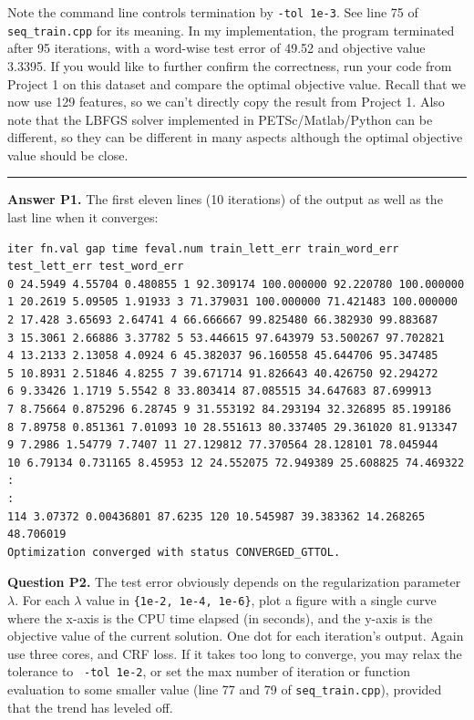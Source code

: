 \documentclass[11pt]{report}
\begin{document}
Note the command line controls termination by \verb!-tol 1e-3!.
See line 75 of \verb!seq_train.cpp! for its meaning.
In my implementation, the program terminated after 95 iterations,
with a word-wise test error of 49.52 and objective value 3.3395.
If you would like to further confirm the correctness,
run your code from Project 1 on this dataset and compare the optimal objective value.
Recall that we now use 129 features, so we can't directly copy the result from Project 1.
Also note that the LBFGS solver implemented in PETSc/Matlab/Python can be different,
so they can be different in many aspects although the optimal objective value should be close.

\rule{\paperwidth}{0.6pt}
{\bf Answer P1.}
The first eleven lines (10 iterations) of the output as well as the last line when it converges:
\begin{verbatim}
iter fn.val gap time feval.num train_lett_err train_word_err test_lett_err test_word_err
0 24.5949 4.55704 0.480855 1 92.309174 100.000000 92.220780 100.000000
1 20.2619 5.09505 1.91933 3 71.379031 100.000000 71.421483 100.000000
2 17.428 3.65693 2.64741 4 66.666667 99.825480 66.382930 99.883687
3 15.3061 2.66886 3.37782 5 53.446615 97.643979 53.500267 97.702821
4 13.2133 2.13058 4.0924 6 45.382037 96.160558 45.644706 95.347485
5 10.8931 2.51846 4.8255 7 39.671714 91.826643 40.426750 92.294272
6 9.33426 1.1719 5.5542 8 33.803414 87.085515 34.647683 87.699913
7 8.75664 0.875296 6.28745 9 31.553192 84.293194 32.326895 85.199186
8 7.89758 0.851361 7.01093 10 28.551613 80.337405 29.361020 81.913347
9 7.2986 1.54779 7.7407 11 27.129812 77.370564 28.128101 78.045944
10 6.79134 0.731165 8.45953 12 24.552075 72.949389 25.608825 74.469322
:
:
114 3.07372 0.00436801 87.6235 120 10.545987 39.383362 14.268265 48.706019
Optimization converged with status CONVERGED_GTTOL.
\end{verbatim}

{\bf Question P2.}
The test error obviously depends on the regularization parameter $\lambda$. For each $\lambda$ value in \verb!{1e-2, 1e-4, 1e-6}!, plot a figure with a single curve where the x-axis is the CPU time elapsed (in seconds), and the y-axis is the objective value of the current solution.
One dot for each iteration's output.
Again use three cores, and CRF loss.
If it takes too long to converge,
you may relax the tolerance to \eg\ \verb!-tol 1e-2!,
or set the max number of iteration or function evaluation to some smaller value
(line 77 and 79 of \verb!seq_train.cpp!),
provided that the trend has leveled off.
\end{document}
